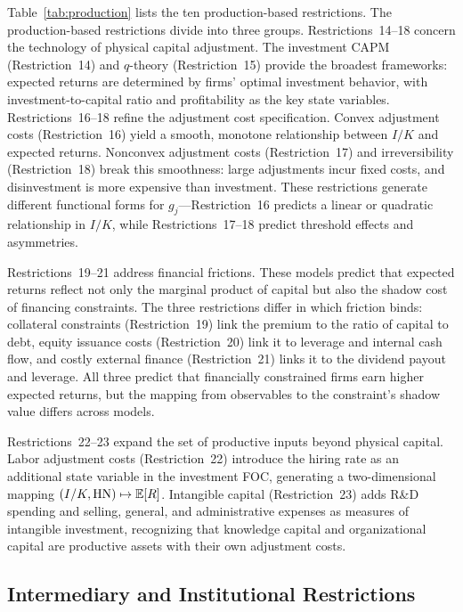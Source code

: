 Table~\ref{tab:production} lists the ten production-based restrictions. The production-based restrictions divide into three groups.
Restrictions~14--18 concern the technology of physical capital adjustment.
The investment CAPM (Restriction~14) and $q$-theory (Restriction~15) provide the broadest frameworks: expected returns are determined by firms' optimal investment behavior, with investment-to-capital ratio and profitability as the key state variables.
Restrictions~16--18 refine the adjustment cost specification.
Convex adjustment costs (Restriction~16) yield a smooth, monotone relationship between $I/K$ and expected returns.
Nonconvex adjustment costs (Restriction~17) and irreversibility (Restriction~18) break this smoothness: large adjustments incur fixed costs, and disinvestment is more expensive than investment.
These restrictions generate different functional forms for $g_j$---Restriction~16 predicts a linear or quadratic relationship in $I/K$, while Restrictions~17--18 predict threshold effects and asymmetries.

Restrictions~19--21 address financial frictions.
These models predict that expected returns reflect not only the marginal product of capital but also the shadow cost of financing constraints.
The three restrictions differ in which friction binds: collateral constraints (Restriction~19) link the premium to the ratio of capital to debt, equity issuance costs (Restriction~20) link it to leverage and internal cash flow, and costly external finance (Restriction~21) links it to the dividend payout and leverage.
All three predict that financially constrained firms earn higher expected returns, but the mapping from observables to the constraint's shadow value differs across models.

Restrictions~22--23 expand the set of productive inputs beyond physical capital.
Labor adjustment costs (Restriction~22) introduce the hiring rate as an additional state variable in the investment FOC, generating a two-dimensional mapping $(I/K, \mathrm{HN}) \mapsto \mathbb{E}[R]$.
Intangible capital (Restriction~23) adds R\&D spending and selling, general, and administrative expenses as measures of intangible investment, recognizing that knowledge capital and organizational capital are productive assets with their own adjustment costs.


\subsection{Intermediary and Institutional Restrictions}\label{sub:intermediary_restrictions}

